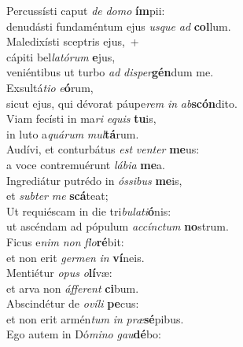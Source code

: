 \evenverse Percussísti caput \textit{de} \textit{do}\textit{mo} \textbf{ím}pii:~\*\\
\evenverse denudásti fundaméntum ejus \textit{us}\textit{que} \textit{ad} \textbf{col}lum.\\
\oddverse Maledixísti sceptris ejus,~+\\
\oddverse  cápiti bel\textit{la}\textit{tó}\textit{rum} \textbf{e}jus,~\*\\
\oddverse veniéntibus ut turbo \textit{ad} \textit{di}\textit{sper}\textbf{gén}dum me.\\
\evenverse Exsultá\textit{ti}\textit{o} \textit{e}\textbf{ó}rum,~\*\\
\evenverse sicut ejus, qui dévorat páupe\textit{rem} \textit{in} \textit{ab}\textbf{scón}dito.\\
\oddverse Viam fecísti in ma\textit{ri} \textit{e}\textit{quis} \textbf{tu}is,~\*\\
\oddverse in luto a\textit{quá}\textit{rum} \textit{mul}\textbf{tá}rum.\\
\evenverse Audívi, et conturbátus \textit{est} \textit{ven}\textit{ter} \textbf{me}us:~\*\\
\evenverse a voce contremuérunt \textit{lá}\textit{bi}\textit{a} \textbf{me}a.\\
\oddverse Ingrediátur putrédo in \textit{ós}\textit{si}\textit{bus} \textbf{me}is,~\*\\
\oddverse et \textit{sub}\textit{ter} \textit{me} \textbf{scá}teat;\\
\evenverse Ut requiéscam in die tri\textit{bu}\textit{la}\textit{ti}\textbf{ó}nis:~\*\\
\evenverse ut ascéndam ad pópulum \textit{ac}\textit{cín}\textit{ctum} \textbf{no}strum.\\
\oddverse Ficus e\textit{nim} \textit{non} \textit{flo}\textbf{ré}bit:~\*\\
\oddverse et non erit \textit{ger}\textit{men} \textit{in} \textbf{ví}neis.\\
\evenverse Mentiétur \textit{o}\textit{pus} \textit{o}\textbf{lí}væ:~\*\\
\evenverse et arva non \textit{áf}\textit{fe}\textit{rent} \textbf{ci}bum.\\
\oddverse Abscindétur de \textit{o}\textit{ví}\textit{li} \textbf{pe}cus:~\*\\
\oddverse et non erit armén\textit{tum} \textit{in} \textit{præ}\textbf{sé}pibus.\\
\evenverse Ego autem in Dó\textit{mi}\textit{no} \textit{gau}\textbf{dé}bo:~\*\\
